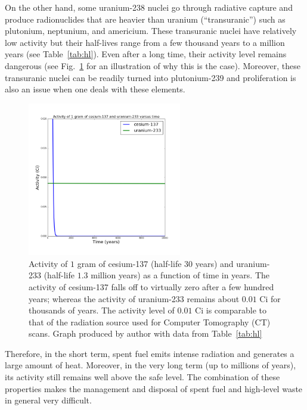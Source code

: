 \documentclass[nofootinbib,preprint,aps]{revtex4-1}
\begin{document}
        On the other hand, some uranium-238 nuclei go through radiative capture
        and produce radionuclides that are
        heavier than uranium (``transuranic'') such as plutonium, neptunium, and americium.
        These transuranic nuclei have relatively low activity but their half-lives range from a few thousand years
        to a million years (see Table~\ref{tab:hl}).
        Even after a long time, their activity level remains dangerous (see Fig.~\ref{fig:csru} for
        an illustration of why this is the case).
        Moreover, these transuranic nuclei can be readily turned into plutonium-239 and proliferation is also
        an issue when one deals with these elements.
        \begin{figure}
            \centering
            \includegraphics[width=0.6\textwidth]{csur.png}
            \caption{Activity of $1$ gram of cesium-137 (half-life $30$ years) and uranium-233 (half-life $1.3$ million
            years) as a function of time in years. The activity of cesium-137 falls off to virtually zero after a few
        hundred years; whereas the activity of uranium-233 remains about $0.01$ Ci for thousands of years. The activity
    level of $0.01$ Ci is comparable to that of the radiation source used for Computer Tomography (CT) scans.
    Graph produced by author with data from Table~\ref{tab:hl}}
            \label{fig:csru}
        \end{figure}
        Therefore, in the short term, spent fuel emits intense radiation and generates a large amount of heat.
        Moreover, in the very long term (up to millions of years), its activity still remains well above the safe level.
        The combination of these properties makes the management and disposal of spent fuel and high-level waste
        in general very difficult.
\end{document}

